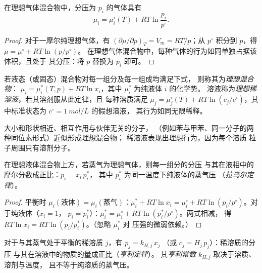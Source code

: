 \begin{proposition}[理想气体的化学势]\label{prop:b2:chemical-potential:mu-gas}
在理想气体混合物中，分压为 $p_i$ 的气体具有
\[
  \mu_i = \mu_i^\circ(T) + RT\ln\frac{p_i}{p^\circ} .
\]
\end{proposition}

\begin{proof}
对于一摩尔纯理想气体，有 $(\partial\mu/\partial p)_T = V_m =
RT/p$；从 $p^\circ$ 积分到 $p$，得 $\mu = \mu^\circ + RT\ln(p/p^\circ)$。
在理想气体混合物中，每种气体的行为如同单独占据该体积，且处于
其分压：将 $p$ 替换为 $p_i$ 即可。
\end{proof}

\begin{definition}\label{def:b2:chemical-potential:ideal-mixture}
若液态（或固态）混合物对每一组分及每一组成均满足下式，
则称其为\emph{理想混合物}：
$\mu_i = \mu_i^*(T, p) + RT\ln x_i$，其中 $\mu_i^*$ 为纯液体 $i$ 的化学势。
溶液称为\emph{理想稀溶液}，若其溶剂服从此定律，且
每种溶质满足
$\mu_j = \mu_j^\circ(T) + RT\ln(c_j/c^\circ)$，其中标准状态为
$c^\circ = \qty{1}{mol/L}$ 的假想溶液，
其行为如同无限稀释。
\end{definition}

大小和形状相近、相互作用与伙伴无关的分子，
（例如苯与甲苯、同一分子的两种同位素形式）近似形成理想混合物；
稀溶液表现出理想行为，因为每个溶质
粒子周围只有溶剂分子。

\begin{theorem}[拉乌尔定律]\label{thm:b2:chemical-potential:raoult}
在理想液体混合物上方，若蒸气为理想气体，则每一组分的分压
与其在液相中的摩尔分数成正比：$p_i = x_i\,p_i^*$，
其中 $p_i^*$ 为同一温度下纯液体的蒸气压
（\emph{拉乌尔定律}）。
\end{theorem}

\begin{proof}
平衡时 $\mu_i(\text{液体}) = \mu_i(\text{蒸气})$：$\mu_i^* +
RT\ln x_i = \mu_i^\circ + RT\ln(p_i/p^\circ)$。对于纯液体（$x_i = 1$，
$p_i = p_i^*$）：$\mu_i^* = \mu_i^\circ + RT\ln(p_i^*/p^\circ)$。两式相减，
得 $RT\ln x_i = RT\ln(p_i/p_i^*)$。（忽略 $\mu_i^*$ 对
压强的微弱依赖。）
\end{proof}

\begin{proposition}[亨利定律]\label{prop:b2:chemical-potential:henry}
对于与其蒸气处于平衡的稀溶质 $j$，有 $p_j = k_{H,j}\,x_j$
（或 $c_j = H_j\,p_j$）：稀溶质的分压
与其在溶液中的物质的量成正比（\emph{亨利定律}）。
其\emph{亨利常数}
$k_{H,j}$ 取决于溶质、溶剂与温度，
且不等于纯溶质的蒸气压。
\end{proposition}

